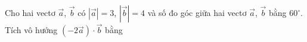 \begin{ex}
Cho hai vectơ $\vec a$, $\vec b$ có $|\vec a|=3$, $|\vec b|=4$ và số đo góc giữa hai vectơ $\vec a$, $\vec b$ bằng $60^\circ$. Tích vô hướng $(-2\vec a)\cdot\vec b$ bằng
\end{ex}
